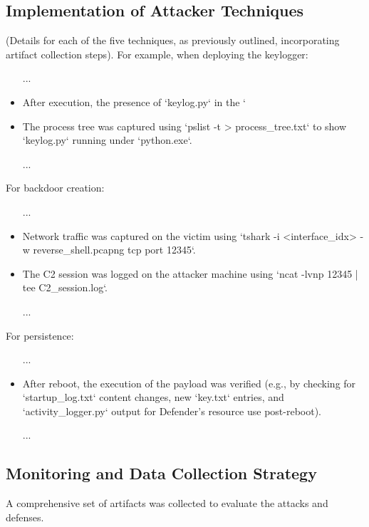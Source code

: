 \documentclass[11pt]{article}
\begin{document}
	\subsection{Implementation of Attacker Techniques}
	(Details for each of the five techniques, as previously outlined, incorporating artifact collection steps).
	For example, when deploying the keylogger:
	\begin{itemize}
		\item[...]
		\item After execution, the presence of `keylog.py` in the `%
		\item The process tree was captured using `pslist -t > process_tree.txt` to show `keylog.py` running under `python.exe`.
		\item[...]
	\end{itemize}
	For backdoor creation:
	\begin{itemize}
		\item[...]
		\item Network traffic was captured on the victim using `tshark -i <interface_idx> -w reverse_shell.pcapng tcp port 12345`.
		\item The C2 session was logged on the attacker machine using `ncat -lvnp 12345 | tee C2_session.log`.
		\item[...]
	\end{itemize}
	For persistence:
	\begin{itemize}
		\item[...]
		\item After reboot, the execution of the payload was verified (e.g., by checking for `startup_log.txt` content changes, new `key.txt` entries, and `activity_logger.py` output for Defender's resource use post-reboot).
		\item[...]
	\end{itemize}
	
	
	\subsection{Monitoring and Data Collection Strategy}
	A comprehensive set of artifacts was collected to evaluate the attacks and defenses.
\end{document}
